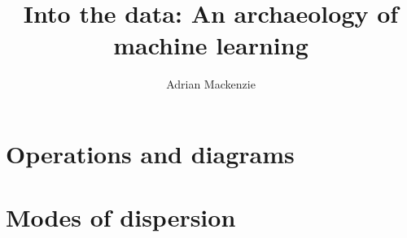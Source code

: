 \documentclass[a4paper,11pt]{book}
\title{ Into the data: An archaeology of machine learning}
\author{Adrian Mackenzie}
\begin{document}
\frontmatter
\maketitle


\tableofcontents
\listoffigures
\listoftables
\mainmatter

\cleardoublepage {} {}
\part*{Operations and diagrams}





\cleardoublepage {} {}
\part*{Modes of dispersion}

%
%
%
%
\backmatter
\printindex
\end{document}

